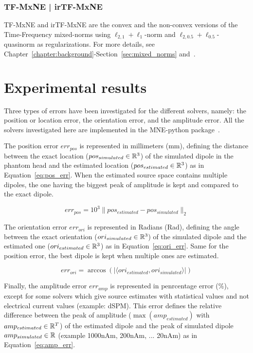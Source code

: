 \subsubsection{TF-MxNE | irTF-MxNE}
\Ac{TF-MxNE} and \ac{irTF-MxNE} are the convex and the non-convex versions of the Time-Frequency mixed-norms using $\ell_{2,1}+\ell_1$-norm and $\ell_{2,0.5}+\ell_{0.5}$-quasinorm as regularizations. For more details, see Chapter~\ref{chapter:background}-Section~\ref{sec:mixed_norms} and~\cite{TF-MxNE,bekhti2016m}.

\section{Experimental results}
Three types of errors have been investigated for the different solvers, namely: the position or location error, the orientation error, and the amplitude error. All the solvers investigated here are implemented in the MNE-python package~\cite{mne-python,mne}.

The position error $err_{pos}$ is represented in millimeters (mm), defining the distance between the exact location ($pos_{simulated}\in\mathbb{R}^3$) of the simulated dipole in the phantom head and the estimated location ($pos_{estimated}\in\mathbb{R}^3$) as in Equation~\eqref{eq:pos_err}. When the estimated source space contains multiple dipoles, the one having the biggest peak of amplitude is kept and compared to the exact dipole.

\begin{equation}\label{eq:pos_err}
err_{pos} = 10^3 \|pos_{estimated} - pos_{simulated}\|_2
\end{equation}

The orientation error $err_{ori}$ is represented in Radians (Rad), defining the angle between the exact orientation ($ori_{simulated}\in\mathbb{R}^3$) of the simulated dipole and the estimated one ($ori_{estimated}\in\mathbb{R}^3$) as in Equation~\eqref{eq:ori_err}. Same for the position error, the best dipole is kept when multiple ones are estimated.

\begin{equation}\label{eq:ori_err}
err_{ori} = \arccos(|\langle ori_{estimated}, ori_{simulated} \rangle|)
\end{equation}

Finally, the amplitude error $err_{amp}$ is represented in penrcentage error (\%), except for some solvers which give source estimates with statistical values and not electrical current values (example: dSPM). This error defines the relative difference between the peak of amplitude ($\max(amp_{estimated})$ with $amp_{estimated}\in\mathbb{R}^T$) of the estimated dipole and the peak of simulated dipole $amp_{simulated}\in\mathbb{R}$ (example 1000nAm, 200nAm, ... 20nAm) as in Equation~\eqref{eq:amp_err}.

